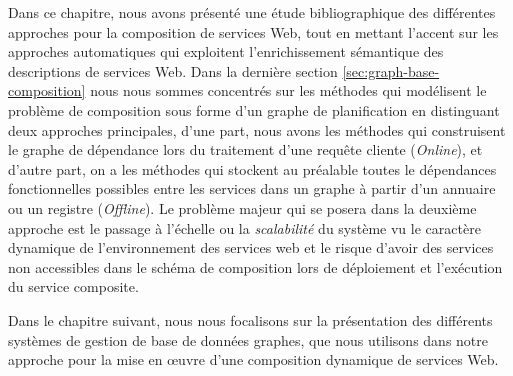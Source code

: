 Dans ce chapitre, nous avons présenté une étude bibliographique des
différentes approches pour la composition de services Web, tout en
mettant l'accent sur les approches automatiques qui exploitent
l'enrichissement sémantique des descriptions de services Web. Dans la
dernière section \ref{sec:graph-base-composition} nous nous sommes
concentrés sur les méthodes qui modélisent le problème de composition
sous forme d'un graphe de planification en distinguant deux approches
principales, d'une part, nous avons les méthodes qui construisent le
graphe de dépendance lors du traitement d'une requête cliente
(\textit{Online}), et d'autre part, on a les méthodes qui stockent au
préalable toutes le dépendances fonctionnelles possibles entre les
services dans un graphe à partir d'un annuaire ou un registre
(\textit{Offline}). Le problème majeur qui se posera dans la deuxième
approche est le passage à l'échelle ou la \textit{scalabilité} du
système vu le caractère dynamique de l'environnement des services web
et le risque d'avoir des services non accessibles dans le schéma de
composition lors de déploiement et l'exécution du service
composite.\medskip

Dans le chapitre suivant, nous nous focalisons sur la présentation des
différents systèmes de gestion de base de données graphes, que nous
utilisons dans notre approche pour la mise en œuvre d'une composition
dynamique de services Web.

